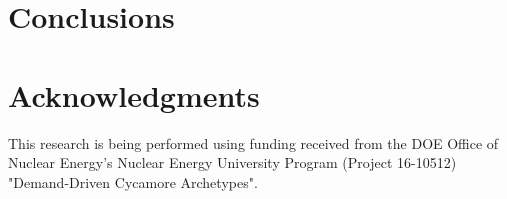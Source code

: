 \documentclass{anstrans}
\begin{document}
\section{Conclusions}

\section{Acknowledgments}
This research is being performed using funding received from the DOE Office of Nuclear Energy's
Nuclear Energy University Program (Project 16-10512) "Demand-Driven Cycamore Archetypes". 



\end{document}
